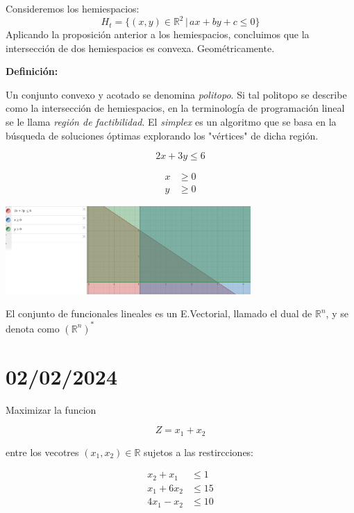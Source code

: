 \documentclass{article}
\begin{document}
Consideremos los hemiespacios:
\[ H_t = \{(x, y) \in \mathbb{R}^2 \,|\, ax + by + c \leq 0\} \]
Aplicando la proposición anterior a los hemiespacios, concluimos que la intersección de dos hemiespacios es convexa. Geométricamente.

\vspace{.25cm}

\textbf{Definición:}

Un conjunto convexo y acotado se denomina \textit{politopo}. Si tal politopo se describe como la intersección de hemiespacios, en la terminología de programación lineal se le llama \textit{región de factibilidad}. El \textit{simplex} es un algoritmo que se basa en la búsqueda de soluciones óptimas explorando los "vértices" de dicha región.

\begin{equation}
    2x + 3y \leq 6
\end{equation}

\begin{align}
    x & \geq 0 \\
    y & \geq 0
\end{align}

\begin{center}
    \includegraphics[width=0.7\textwidth]{./imagenes/imagen1.png}
\end{center}

El conjunto de funcionales lineales es un E.Vectorial, llamado el dual de $\mathbb{R}^n$, y se denota como $(\mathbb{R}^n)^*$
\newpage
\section{02/02/2024}

Maximizar la funcion

\begin{equation}
    Z = x_1 + x_2
\end{equation}

entre los vecotres $(x_1, x_2) \in \mathbb{R}$ sujetos a las restircciones:

\begin{align}
    x_2 + x_1  & \leq 1  \\
    x_1 + 6x_2 & \leq 15 \\
    4x_1 - x_2 & \leq 10
\end{align}
\end{document}
